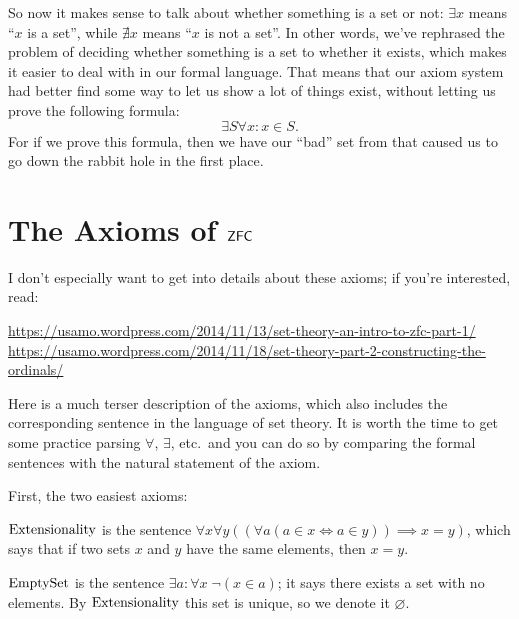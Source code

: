 So now it makes sense to talk about whether something is a set or not: $\exists x$ means ``$x$ is a set'', while $\nexists x$ means ``$x$ is not a set''.
In other words, we've rephrased the problem of deciding whether something is a set to whether it exists, which makes it easier to deal with in our formal language.
That means that our axiom system had better find some way to let us show a lot of things exist, without letting us prove the following formula:
\[ \exists S \forall x : x \in S. \]
For if we prove this formula, then we have our ``bad'' set from that caused us to go down the rabbit hole in the first place.


\section{The Axioms of $\mathsf{ZFC}$}
I don't especially want to get into details about these axioms;
if you're interested, read:
\begin{itemize}
	\ii \footnotesize \url{https://usamo.wordpress.com/2014/11/13/set-theory-an-intro-to-zfc-part-1/}
	\ii \footnotesize \url{https://usamo.wordpress.com/2014/11/18/set-theory-part-2-constructing-the-ordinals/}
\end{itemize}
Here is a much terser description of the axioms,
which also includes the corresponding sentence in the language of set theory.
It is worth the time to get some practice parsing $\forall$, $\exists$, etc.\
and you can do so by comparing the formal sentences with the natural statement of the axiom.

First, the two easiest axioms:
\begin{itemize}
	\ii $\mathrm{Extensionality}$ is the sentence
	$\forall x \forall y
	\left( \left( \forall a  \left( a \in x \iff a \in y \right) \right)
	\implies x = y \right)$,
	which says that if two sets $x$ and $y$ have the same elements,
	then $x = y$.

	\ii $\mathrm{EmptySet}$ is the sentence $\exists a : \forall x \; \neg (x \in a)$;
	it says there exists a set with no elements.
	By $\mathrm{Extensionality}$ this set is unique, so we denote it $\varnothing$.
\end{itemize}

